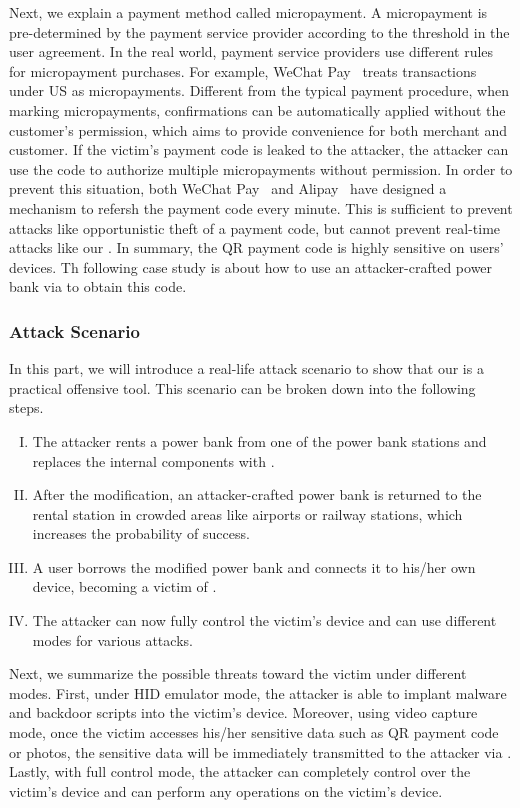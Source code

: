 Next, we explain a payment method called micropayment.
A micropayment is pre-determined by the payment service provider according to the threshold in the user agreement.
In the real world, payment service providers use different rules for micropayment purchases.
For example, WeChat Pay~\cite{Wechat-pay} treats transactions under US as micropayments.
Different from the typical payment procedure, when marking micropayments, confirmations can be automatically applied without the customer's permission, which aims to provide convenience for both merchant and customer.
If the victim's payment code is leaked to the attacker, the attacker can use the code to authorize multiple micropayments without permission.
In order to prevent this situation, both WeChat Pay~\cite{Wechat-pay} and Alipay~\cite{AliPay} have designed a mechanism to refersh the payment code every minute.
This is sufficient to prevent attacks like opportunistic theft of a payment code, but cannot prevent real-time attacks like our \tool.
In summary, the QR payment code is highly sensitive on users' devices. Th following case study is about how to use an attacker-crafted power bank via \tool to obtain this code.

\subsubsection{Attack Scenario}
\label{subsec:attack-scenario}

In this part, we will introduce a real-life attack scenario to show that our \tool is a practical offensive tool.
This scenario can be broken down into the following steps.

\begin{enumerate}[I. ]
	\item The attacker rents a power bank from one of the power bank stations and replaces the internal components with \tool.
	\item After the modification, an attacker-crafted power bank is returned to the rental station in crowded areas like airports or railway stations, which increases the probability of success.
	\item A user borrows the modified power bank and connects it to his/her own device, becoming a victim of \tool.
	\item The attacker can now fully control the victim's device and can use different modes for various attacks.
\end{enumerate}

Next, we summarize the possible threats toward the victim under different modes.
First, under \ac{HID} emulator mode, the attacker is able to implant malware and backdoor scripts into the victim's device. Moreover, using video capture mode, once the victim accesses his/her sensitive data such as QR payment code or photos, the sensitive data will be immediately transmitted to the attacker via \tool. Lastly, with full control mode, the attacker can completely control over the victim's device and can perform any operations on the victim's device.

